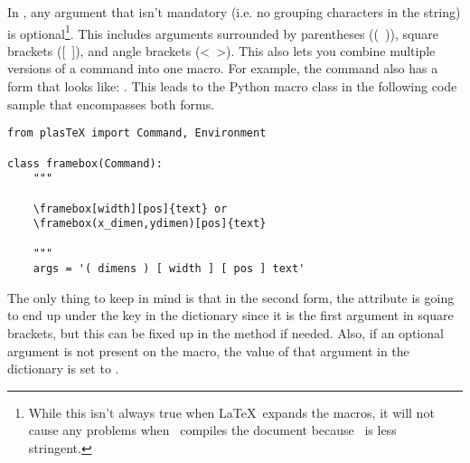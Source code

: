 In \plasTeX, any argument that isn't mandatory (i.e. no grouping characters
in the  string) is optional\footnote{While this isn't always true
when \LaTeX\ expands the macros, it will not cause any problems when
\plasTeX\ compiles the document because \plasTeX\ is less stringent.}.
This includes arguments surrounded by parentheses ((~)), square brackets
([~]), and angle brackets (<~>).  This also lets you combine multiple
versions of a command into one macro.  For example, the 
command also has a form that looks like: 
.  This leads to the 
Python macro class in the following code sample that encompasses both 
forms.
\begin{verbatim}
from plasTeX import Command, Environment

class framebox(Command):
    """ 

    \framebox[width][pos]{text} or 
    \framebox(x_dimen,ydimen)[pos]{text} 

    """
    args = '( dimens ) [ width ] [ pos ] text'
\end{verbatim}
The only thing to keep in mind is that in the second form, the 
attribute is going to end up under the  key in the 
 dictionary since it is the first argument in 
square brackets, but this can be fixed up in the  method
if needed.  Also, if an optional argument is not present on the 
macro, the value of that argument in the  dictionary
is set to .

